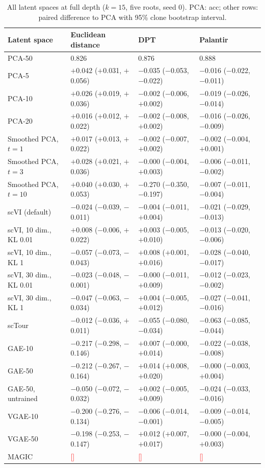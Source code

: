 \documentclass[10pt,a4paper,twocolumn]{article}
\newcommand{\todo}[1]{\textcolor{red}{[#1]}}
\begin{document}
\begin{table}[t]
\centering\scriptsize
\caption{All latent spaces at full depth ($k=15$, five roots, seed 0). PCA: acc; other rows:
paired difference to PCA with 95\% clone bootstrap interval.}
\label{tab:fullall}
\setlength{\tabcolsep}{3pt}
\begin{tabular}{llll}
\toprule
Latent space & Euclidean distance & DPT & Palantir \\
\midrule
PCA-50 & 0.826 & 0.876 & 0.888 \\ \midrule
PCA-5 & $+$0.042 ($+$0.031, $+$0.056) & $-$0.035 ($-$0.053, $-$0.022) & $-$0.016 ($-$0.022, $-$0.011) \\
PCA-10 & $+$0.026 ($+$0.019, $+$0.036) & $-$0.002 ($-$0.006, $+$0.002) & $-$0.019 ($-$0.026, $-$0.014) \\
PCA-20 & $+$0.016 ($+$0.012, $+$0.022) & $-$0.002 ($-$0.008, $+$0.002) & $-$0.016 ($-$0.026, $-$0.009) \\
Smoothed PCA, $t=1$ & $+$0.017 ($+$0.013, $+$0.022) & $-$0.002 ($-$0.007, $+$0.002) & $-$0.002 ($-$0.004, $+$0.001) \\
Smoothed PCA, $t=3$ & $+$0.028 ($+$0.021, $+$0.036) & $-$0.000 ($-$0.004, $+$0.003) & $-$0.006 ($-$0.011, $-$0.002) \\
Smoothed PCA, $t=10$ & $+$0.040 ($+$0.030, $+$0.053) & $-$0.270 ($-$0.350, $-$0.197) & $-$0.007 ($-$0.011, $-$0.004) \\
scVI (default) & $-$0.024 ($-$0.039, $-$0.011) & $-$0.004 ($-$0.011, $+$0.004) & $-$0.021 ($-$0.029, $-$0.013) \\
scVI, 10 dim., KL 0.01 & $+$0.008 ($-$0.006, $+$0.022) & $+$0.003 ($-$0.005, $+$0.010) & $-$0.013 ($-$0.020, $-$0.006) \\
scVI, 10 dim., KL 1 & $-$0.057 ($-$0.073, $-$0.043) & $+$0.008 ($+$0.001, $+$0.016) & $-$0.028 ($-$0.040, $-$0.017) \\
scVI, 30 dim., KL 0.01 & $-$0.023 ($-$0.048, $-$0.001) & $-$0.000 ($-$0.011, $+$0.009) & $-$0.012 ($-$0.023, $-$0.002) \\
scVI, 30 dim., KL 1 & $-$0.047 ($-$0.063, $-$0.034) & $+$0.004 ($-$0.005, $+$0.012) & $-$0.027 ($-$0.041, $-$0.016) \\
scTour & $-$0.012 ($-$0.036, $+$0.011) & $-$0.055 ($-$0.080, $-$0.034) & $-$0.063 ($-$0.085, $-$0.044) \\
GAE-10 & $-$0.217 ($-$0.298, $-$0.146) & $+$0.007 ($-$0.000, $+$0.014) & $-$0.022 ($-$0.038, $-$0.008) \\
GAE-50 & $-$0.212 ($-$0.267, $-$0.164) & $+$0.014 ($+$0.008, $+$0.020) & $-$0.000 ($-$0.003, $+$0.004) \\
GAE-50, untrained & $-$0.050 ($-$0.072, $-$0.032) & $+$0.002 ($-$0.005, $+$0.009) & $-$0.024 ($-$0.033, $-$0.016) \\
VGAE-10 & $-$0.200 ($-$0.276, $-$0.134) & $-$0.006 ($-$0.014, $-$0.001) & $-$0.009 ($-$0.014, $-$0.005) \\
VGAE-50 & $-$0.198 ($-$0.253, $-$0.147) & $+$0.012 ($+$0.007, $+$0.017) & $-$0.000 ($-$0.004, $+$0.003) \\
MAGIC & \todo{} & \todo{} & \todo{} \\
\bottomrule
\end{tabular}
\end{table}
\end{document}
